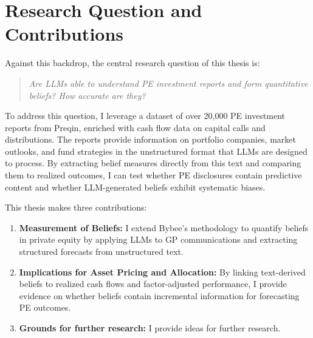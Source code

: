 \section{Research Question and Contributions}\label{sec:research-question-and-contributions}

Against this backdrop, the central research question of this thesis is:

\begin{quote}
    \emph{Are LLMs able to understand PE investment reports and form quantitative beliefs? How accurate are they?}
\end{quote}

To address this question, I leverage a dataset of over 20,000 PE investment reports from Preqin, enriched with cash flow data on capital calls and distributions.
The reports provide information on portfolio companies, market outlooks, and fund strategies in the unstructured format that LLMs are designed to process.
By  extracting belief measures directly from this text and comparing them to realized outcomes, I can test whether PE disclosures contain predictive
content and whether LLM-generated beliefs exhibit systematic biases.

This thesis makes three contributions:

\begin{enumerate}
    \item \textbf{Measurement of Beliefs:} I extend Bybee's methodology
    to quantify beliefs in private equity by applying LLMs to GP
    communications and extracting structured forecasts from unstructured
    text.
    \item \textbf{Implications for Asset Pricing and Allocation:} By linking
    text-derived beliefs to realized cash flows and factor-adjusted
    performance, I provide evidence on whether beliefs contain incremental
    information for forecasting PE outcomes.
    \item \textbf{Grounds for further research:} I provide ideas for further research.
\end{enumerate}